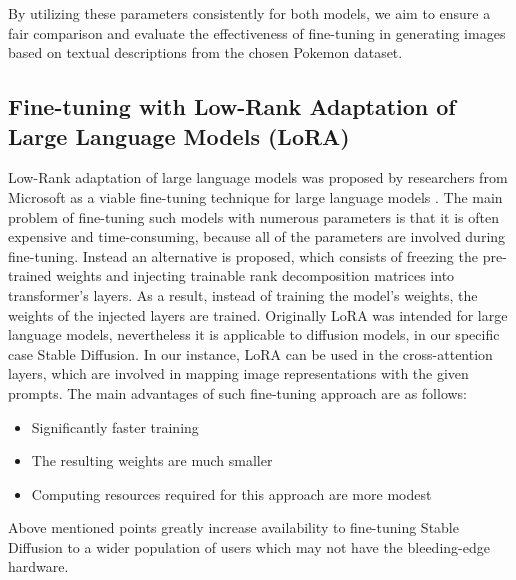 \documentclass[conference]{IEEEtran}
\begin{document}
By utilizing these parameters consistently for both models, we aim to ensure a fair comparison and evaluate the effectiveness of fine-tuning in generating images based on textual descriptions from the chosen Pokemon dataset.

\subsection{Fine-tuning with Low-Rank Adaptation of Large Language Models (LoRA)}
Low-Rank adaptation of large language models was proposed by researchers from Microsoft as a viable fine-tuning technique for large language models \cite{hu2021lora}. The main problem of fine-tuning such models with numerous parameters is that it is often expensive and time-consuming, because all of the parameters are involved during fine-tuning. Instead an alternative is proposed, which consists of freezing the pre-trained weights and injecting trainable rank decomposition matrices into transformer's layers. As a result, instead of training the model's weights, the weights of the injected layers are trained. Originally LoRA was intended for large language models, nevertheless it is applicable to diffusion models, in our specific case Stable Diffusion. In our instance, LoRA can be used in the cross-attention layers, which are involved in mapping image representations with the given prompts. The main advantages of such fine-tuning approach are as follows:
\begin{itemize}
\item Significantly faster training
\item The resulting weights are much smaller
\item Computing resources required for this approach are more modest
\end{itemize}

Above mentioned points greatly increase availability to fine-tuning Stable Diffusion to a wider population of users which may not have the bleeding-edge hardware.



\end{document}
